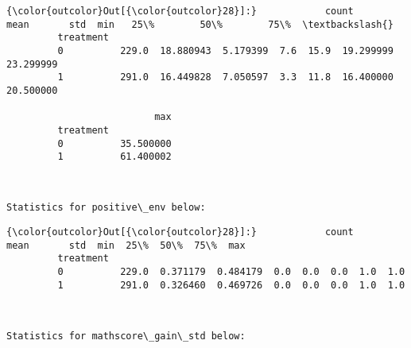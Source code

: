 \documentclass[11pt]{article}
\begin{document}
\begin{Verbatim}[commandchars=\\\{\}]
{\color{outcolor}Out[{\color{outcolor}28}]:}            count       mean       std  min   25\%        50\%        75\%  \textbackslash{}
         treatment                                                                
         0          229.0  18.880943  5.179399  7.6  15.9  19.299999  23.299999   
         1          291.0  16.449828  7.050597  3.3  11.8  16.400000  20.500000   
         
                          max  
         treatment             
         0          35.500000  
         1          61.400002  
\end{Verbatim}
            
    \begin{center}
    \end{center}
    { \hspace*{\fill} \\}
    
    \begin{Verbatim}[commandchars=\\\{\}]
Statistics for positive\_env below:

    \end{Verbatim}

\begin{Verbatim}[commandchars=\\\{\}]
{\color{outcolor}Out[{\color{outcolor}28}]:}            count      mean       std  min  25\%  50\%  75\%  max
         treatment                                                    
         0          229.0  0.371179  0.484179  0.0  0.0  0.0  1.0  1.0
         1          291.0  0.326460  0.469726  0.0  0.0  0.0  1.0  1.0
\end{Verbatim}
            
    \begin{center}
    \end{center}
    { \hspace*{\fill} \\}
    
    \begin{Verbatim}[commandchars=\\\{\}]
Statistics for mathscore\_gain\_std below:

    \end{Verbatim}
\end{document}
